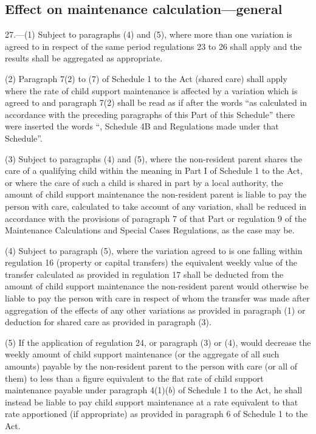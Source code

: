 \documentclass[12pt,a4paper]{article}
\begin{document}
\subsection[27. Effect on maintenance calculation—general]{Effect on maintenance calculation—general}

27.---(1)  Subject to paragraphs (4) and (5), where more than one variation is agreed to in respect of the same period regulations 23 to 26 shall apply and the results shall be aggregated as appropriate.

(2) Paragraph 7(2) to (7) of Schedule 1 to the Act (shared care) shall apply where the rate of child support maintenance is affected by a variation which is agreed to and paragraph 7(2) shall be read as if after the words “as calculated in accordance with the preceding paragraphs of this Part of this Schedule” there were inserted the words “, Schedule 4B and Regulations made under that Schedule”.

(3) Subject to paragraphs (4) and (5), where the non-resident parent shares the care of a qualifying child within the meaning in Part I of Schedule 1 to the Act, or where the care of such a child is shared in part by a local authority, the amount of child support maintenance the non-resident parent is liable to pay the person with care, calculated to take account of any variation, shall be reduced in accordance with the provisions of paragraph 7 of that Part or regulation 9 of the Maintenance Calculations and Special Cases Regulations, as the case may be.

(4) Subject to paragraph (5), where the variation agreed to is one falling within regulation 16 (property or capital transfers) the equivalent weekly value of the transfer calculated as provided in regulation 17 shall be deducted from the amount of child support maintenance the non-resident parent would otherwise be liable to pay the person with care in respect of whom the transfer was made after aggregation of the effects of any other variations as provided in paragraph (1) or deduction for shared care as provided in paragraph (3).

(5) If the application of regulation 24, or paragraph (3) or (4), would decrease the weekly amount of child support maintenance (or the aggregate of all such amounts) payable by the non-resident parent to the person with care (or all of them) to less than a figure equivalent to the flat rate of child support maintenance payable under paragraph 4(1)($b$)  of Schedule 1 to the Act, he shall instead be liable to pay child support maintenance at a rate equivalent to that rate apportioned (if appropriate) as provided in paragraph 6 of Schedule 1 to the Act.
\end{document}
